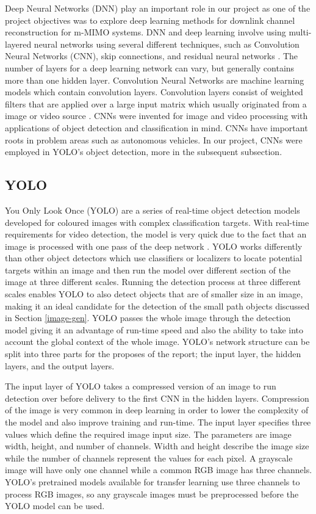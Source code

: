 Deep Neural Networks (DNN) play an important role in our project as one of the project objectives was to explore deep learning methods for downlink channel reconstruction for m-MIMO systems.  DNN and deep learning involve using multi-layered neural networks using several different techniques, such as Convolution Neural Networks (CNN), skip connections, and residual neural networks \cite{Burkov2019}. The number of layers for a deep learning network can vary, but generally contains more than one hidden layer.
Convolution Neural Networks are machine learning models which contain convolution layers. Convolution layers consist of weighted filters that are applied over a large input matrix which usually originated from a image or video source \cite{Burkov2019}. CNNs were invented for image and video processing with applications of object detection and classification in mind. CNNs have important roots in problem areas such as autonomous vehicles. In our project, CNNs were employed in YOLO's object detection, more in the subsequent subsection.

\subsection{YOLO}

You Only Look Once (YOLO) are a series of real-time object detection models developed for coloured images with complex classification targets. With real-time requirements for video detection, the model is very quick due to the fact that an image is processed with one pass of the deep network \cite{Redmon2018}. YOLO works differently than other object detectors which use classifiers or localizers to locate potential targets within an image and then run the model over different section of the image at three different scales. Running the detection process at three different scales enables YOLO to also detect objects that are of smaller size in an image, making it an ideal candidate for the detection of the small path objects discussed in Section \ref{image-gen}. YOLO passes the whole image through the detection model giving it an advantage of run-time speed and also the ability to take into account the global context of the whole image. YOLO's network structure can be split into three parts for the proposes of the report; the input layer, the hidden layers, and the output layers.

The input layer of YOLO takes a compressed version of an image to run detection over before delivery to the first CNN in the hidden layers. Compression of the image is very common in deep learning in order to lower the complexity of the model and also improve training and run-time. The input layer specifies three values which define the required image input size. The parameters are image width, height, and number of channels. Width and height describe the image size while the number of channels represent the values for each pixel. A grayscale image will have only one channel while a common RGB image has three channels. YOLO's pretrained models available for transfer learning use three channels to process RGB images, so any grayscale images must be preprocessed before the YOLO model can be used.


